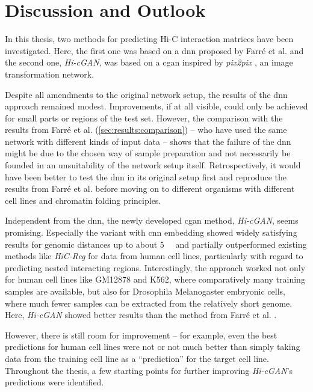%
\section{Discussion and Outlook}
In this thesis, two methods for predicting Hi-C interaction matrices have been investigated.
Here, the first one was based on a \acrlong{dnn} proposed by Farr\'e et al. \cite{Farre2018a} and the second one, \emph{Hi-cGAN}, 
was based on a \acrlong{cgan} inspired by \emph{pix2pix} \cite{Isola2017}, an image transformation network.

Despite all amendments to the original network setup,
the results of the \acrlong{dnn} approach remained modest.
Improvements, if at all visible, could only be achieved for small parts or regions of the test set.
However, the comparison with the results from Farr\'e et al. \cite{Farre2018a} (\cref{sec:results:comparison}) -- who have used the same network with different kinds of input data --
shows that the failure of the \acrshort{dnn} might be due to the chosen way of sample preparation 
and not necessarily be founded in an unsuitability of the network setup itself.
Retrospectively, it would have been better to test the \acrshort{dnn} in its original setup first and reproduce the results from Farr\'e et al. \cite{Farre2018a} 
before moving on to different organisms with different cell lines and chromatin folding principles.

Independent from the \acrshort{dnn}, the newly developed \acrlong{cgan} method, \emph{Hi-cGAN}, seems promising.
Especially the variant with \acrshort{cnn} embedding showed widely satisfying results for genomic distances up to about \SI{5}{\mega\bp}
and partially outperformed existing methods like \emph{HiC-Reg} \cite{Zhang2019} for data from human cell lines, 
particularly with regard to predicting nested interacting regions.
Interestingly, the approach worked not only for human cell lines like GM12878 and K562, where comparatively many training samples are available,
but also for Drosophila Melanogaster embryonic cells, where much fewer samples can be extracted from the relatively short genome.
Here, \emph{Hi-cGAN} showed better results than the method from Farr\'e et al. \cite{Farre2018a}.

However, there is still room for improvement -- for example, even the best predictions for human cell lines were not or not much better 
than simply taking data from the training cell line as a ``prediction'' for the target cell line.
Throughout the thesis, a few starting points for further improving \emph{Hi-cGAN}'s predictions were identified.

